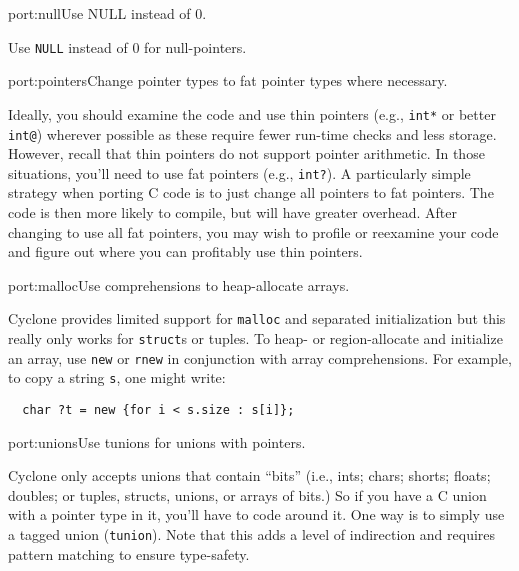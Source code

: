 \begin{porta}
{port:null}{Use NULL instead of 0.}

Use \texttt{NULL} instead of 0 for null-pointers.  
\end{porta}

\begin{porta}
{port:pointers}{Change pointer types to fat pointer types where necessary.}  

Ideally, you should examine the code and use thin pointers (e.g., \texttt{int*}
or better \texttt{int@}) wherever possible as these require fewer
run-time checks and less storage.  However, recall that thin pointers
do not support pointer arithmetic.  In those situations, you'll need
to use fat pointers (e.g., \texttt{int?}).  A particularly simple strategy 
when porting C code is to just change all pointers to fat pointers.
The code is then more likely to compile, but will have greater overhead.
After changing to use all fat pointers, you may wish to profile or reexamine
your code and figure out where you can profitably use thin pointers.
\end{porta}

\begin{porta}{port:malloc}{Use comprehensions to heap-allocate arrays.}

Cyclone provides limited support for \texttt{malloc} and separated
initialization but this really only works for \texttt{struct}s or
tuples.  To heap- or region-allocate and initialize an array, use
\texttt{new} or \texttt{rnew} in conjunction with array comprehensions.  
For example, to copy a string \texttt{s}, one might write:
\begin{verbatim}
  char ?t = new {for i < s.size : s[i]};
\end{verbatim}


\end{porta}

\begin{porta}{port:unions}{Use tunions for unions with pointers.}

Cyclone only accepts unions that contain ``bits'' (i.e., ints; chars;
shorts; floats; doubles; or tuples, structs, unions, or arrays of bits.)
So if you have a C union with a pointer type in it, you'll have to
code around it.  One way is to simply use a tagged union (\texttt{tunion}).
Note that this adds a level of indirection and requires pattern
matching to ensure type-safety.  

\end{porta}


